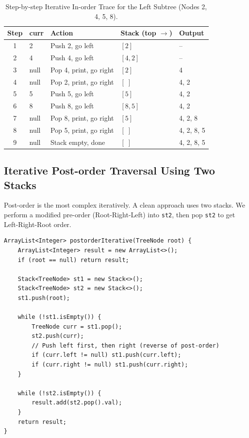 \documentclass[10pt,journal,compsoc,onecolumn]{IEEEtran}
\begin{document}
\begin{table}[htbp]
\centering
\caption{Step-by-step Iterative In-order Trace for the Left Subtree (Nodes 2, 4, 5, 8).}
\label{tab:iter_inorder_trace}
\begin{tabular}{cllll}
\toprule
Step & curr & Action & Stack (top $\to$) & Output \\
\midrule
1 & 2 & Push 2, go left & $[2]$ & -- \\
2 & 4 & Push 4, go left & $[4, 2]$ & -- \\
3 & null & Pop 4, print, go right & $[2]$ & 4 \\
4 & null & Pop 2, print, go right & $[\;]$ & 4, 2 \\
5 & 5 & Push 5, go left & $[5]$ & 4, 2 \\
6 & 8 & Push 8, go left & $[8, 5]$ & 4, 2 \\
7 & null & Pop 8, print, go right & $[5]$ & 4, 2, 8 \\
8 & null & Pop 5, print, go right & $[\;]$ & 4, 2, 8, 5 \\
9 & null & Stack empty, done & $[\;]$ & 4, 2, 8, 5 \\
\bottomrule
\end{tabular}
\end{table}

\subsection{Iterative Post-order Traversal Using Two Stacks}

Post-order is the most complex iteratively. A clean approach uses two stacks. We perform a modified pre-order (Root-Right-Left) into \texttt{st2}, then pop \texttt{st2} to get Left-Right-Root order.

\begin{verbatim}
ArrayList<Integer> postorderIterative(TreeNode root) {
    ArrayList<Integer> result = new ArrayList<>();
    if (root == null) return result;

    Stack<TreeNode> st1 = new Stack<>();
    Stack<TreeNode> st2 = new Stack<>();
    st1.push(root);

    while (!st1.isEmpty()) {
        TreeNode curr = st1.pop();
        st2.push(curr);
        // Push left first, then right (reverse of post-order)
        if (curr.left != null) st1.push(curr.left);
        if (curr.right != null) st1.push(curr.right);
    }

    while (!st2.isEmpty()) {
        result.add(st2.pop().val);
    }
    return result;
}
\end{verbatim}
\end{document}
